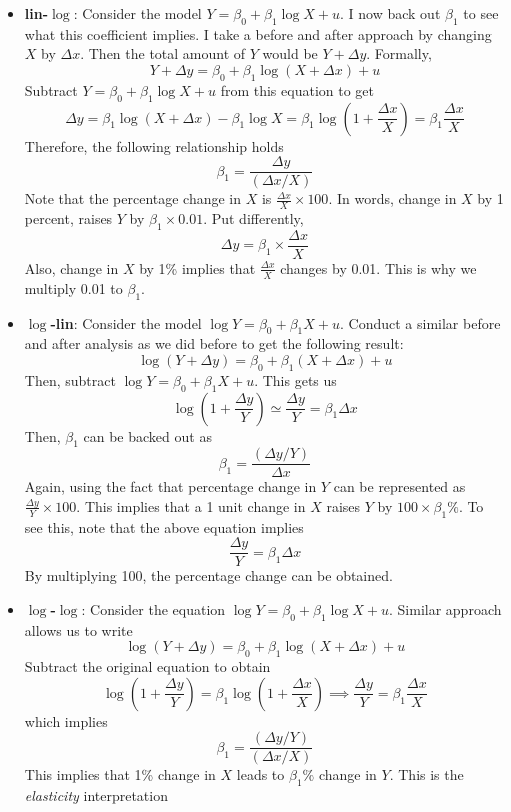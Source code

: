 \documentclass[12pt]{article}
\theoremstyle{definition}
\theoremstyle{property}
\theoremstyle{assumption}
\theoremstyle{example}
\theoremstyle{comment}
\begin{document}
\begin{itemize}
\item\textbf{lin-$\log$}:  Consider the model $Y=\beta_0 + \beta_1 \log{X}+u$. I now back out $\beta_1$ to see what this coefficient implies. I take a before and after approach by changing $X$ by $\Delta x$. Then the total amount of $Y$ would be $Y+\Delta y$. Formally, 
\[
Y+\Delta y = \beta_0 + \beta_1 \log(X+\Delta x)+u
\]
Subtract $Y=\beta_0 + \beta_1 \log{X}+u$ from this equation to get
\[
\Delta y = \beta_1 \log(X+\Delta x)-\beta_1\log{X} = \beta_1 \log\left(1+\frac{\Delta x}{X} \right) = \beta_1 \frac{\Delta x}{X}
\]
Therefore, the following relationship holds
\[
\beta_1 = \frac{\Delta y}{(\Delta x/X)}
\]
Note that the percentage change in $X$ is $\frac{\Delta x}{X} \times 100$. In words, change in $X$ by 1 percent, raises $Y$ by $\beta_1 \times 0.01$. Put differently, 
\[
\Delta y = \beta_1 \times \frac{\Delta x}{X}
\]
Also, change in $X$ by 1\% implies that $\frac{\Delta x}{X}$ changes by 0.01. This is why we multiply 0.01 to $\beta_1$. 
\item\textbf{$\log$-lin}: Consider the model $\log{Y}=\beta_0 + \beta_1 X+u$. Conduct a similar before and after analysis as we did before to get the following result:
\[
\log(Y+\Delta y) = \beta_0 + \beta_1(X+\Delta x)+u
\]
Then, subtract $\log{Y}=\beta_0 + \beta_1 X+u$. This gets us
\[
\log\left(1+\frac{\Delta y}{Y}\right)\simeq \frac{\Delta y}{Y} = \beta_1 \Delta x
\]
Then, $\beta_1$ can be backed out as
\[
\beta_1 = \frac{(\Delta y / Y)}{\Delta x}
\]
Again, using the fact that percentage change in $Y$ can be represented as $\frac{\Delta y}{Y}\times 100$. This implies that a 1 unit change in $X$ raises $Y$ by $100\times \beta_1\%$. To see this, note that the above equation implies
\[
\frac{\Delta y}{Y} = \beta_1 \Delta x
\] 
By multiplying 100, the percentage change can be obtained. 
\item\textbf{$\log$-$\log$}: Consider the equation $\log{Y} = \beta_0 + \beta_1\log{X}+u$. Similar approach allows us to write
\[
\log(Y+\Delta y) = \beta_0 + \beta_1 \log(X+\Delta x)+u
\]
Subtract the original equation to obtain
\[
\log\left(1+\frac{\Delta y}{Y}\right)=\beta_1\log\left(1+\frac{\Delta x}{X}\right) \implies \frac{\Delta y}{Y}=\beta_1\frac{\Delta x}{X}
\]
which implies 
\[
\beta_1 = \frac{(\Delta y/Y)}{(\Delta x/X)}
\]
This implies that 1\% change in $X$ leads to $\beta_1\%$ change in $Y$. This is the \textit{elasticity} interpretation
\end{itemize}
\end{document}
